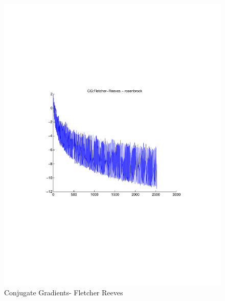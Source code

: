 \documentclass[12pt]{amsart}
\begin{document}
\begin{figure}[thpb]
\centering
\includegraphics[scale=0.60,clip=true,viewport=1in 3in 8in 8in]{images/rosenbrock-20/CGFR.pdf}
\caption{Conjugate Gradients- Fletcher Reeves}
\label{fig:CGFR-rosen}
\end{figure}
\end{document}
